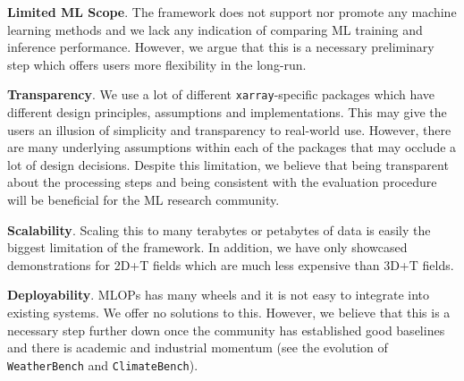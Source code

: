 \textbf{Limited ML Scope}. The framework does not support nor promote any machine learning methods and we lack any indication of comparing ML training and inference performance. However, we argue that this is a necessary preliminary step which offers users more flexibility in the long-run.

\textbf{Transparency}. We use a lot of different \texttt{xarray}-specific packages which have different design principles, assumptions and implementations. This may give the users an illusion of simplicity and transparency to real-world use. However, there are many underlying assumptions within each of the packages that may occlude a lot of design decisions.
Despite this limitation, we believe that being transparent about the processing steps and being consistent with the evaluation procedure will be beneficial for the ML research community.

\textbf{Scalability}. Scaling this to many terabytes or petabytes of data is easily the biggest limitation of the framework. In addition, we have only showcased demonstrations for 2D+T fields which are much less expensive than 3D+T fields.

\textbf{Deployability}. MLOPs has many wheels and it is not easy to integrate into existing systems. We offer no solutions to this. 
However, we believe that this is a necessary step further down once the community has established good baselines and there is academic and industrial momentum (see the evolution of \texttt{WeatherBench} and \texttt{ClimateBench}).






